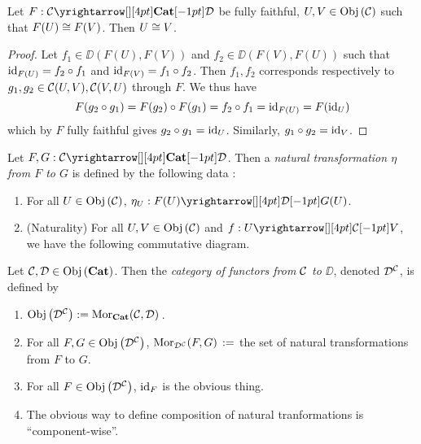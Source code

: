 \begin{prop}
  
  Let $F : \map{\CC}{\DD}{\CAT}{}$ be fully faithful,
  $U, V \in \obj{\CC}$ such that $F(U) \iso F(V)$.
  Then $U \iso V$. 
\end{prop}
\begin{proof}
  Let $f_1 \in \DD(F(U),F(V))$ and $f_2 \in \DD(F(V),F(U))$ such that 
  $\id{F(U)} = f_2 \circ f_1$ and $\id{F(V)} = f_1 \circ f_2$. 
  Then $f_1, f_2$ corresponds respectively to $g_1, g_2 \in \CC(U,V), \CC(V,U)$
  through $F$. 
  We thus have 
  \[ 
    F(g_2 \circ g_1) = F(g_2) \circ F(g_1) = f_2 \circ f_1 = \id{F(U)}
    = F(\id{U})
  \]
  which by $F$ fully faithful gives $g_2 \circ g_1 = \id{U}$. 
  Similarly, $g_1 \circ g_2 = \id{V}$.
\end{proof}

\begin{dfn}
  
  Let $F, G : \map{\CC}{\DD}{\CAT}{}$. 
  Then a \emph{natural transformation $\eta$ from $F$ to $G$} is defined by 
  the following data : 
  \begin{enumerate}
    \item For all $U \in \obj{\CC}$, $\eta_U : \map{F(U)}{G(U)}{\DD}{}$. 
    \item (Naturality) 
    For all $U, V \in \obj{\CC}$ and $f : \map{U}{V}{\CC}{}$, 
    we have the following commutative diagram. \begin{figure}[H]
      \centering
    \end{figure}
  \end{enumerate}
\end{dfn}

\begin{dfn}
  
  Let $\CC, \DD \in \obj{\CAT}$. 
  Then the \emph{category of functors from $\CC$ to $\DD$},
  denoted $\DD^\CC$, is defined by 
  \begin{enumerate}
    \item $\obj{\DD^\CC} := \mor{\CC}{\DD}{\CAT}$. 
    \item For all $F, G \in \obj{\DD^\CC}$, 
    $\mor{F}{G}{\DD^\CC} := $
    the set of natural transformations from $F$ to $G$. 
    \item For all $F \in \obj{\DD^\CC}$, $\id{F}$ is the obvious thing.
    \item The obvious way to define composition of natural tranformations is ``component-wise''.
  \end{enumerate}
\end{dfn}

